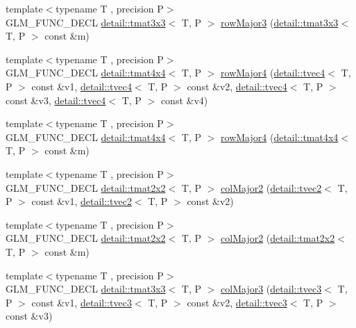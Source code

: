 \begin{DoxyCompactItemize}
{\footnotesize template$<$typename T , precision P$>$ }\\G\+L\+M\+\_\+\+F\+U\+N\+C\+\_\+\+D\+E\+CL \hyperlink{structglm_1_1detail_1_1tmat3x3}{detail\+::tmat3x3}$<$ T, P $>$ \hyperlink{group__gtx__matrix__major__storage_gafb5e7381b2451a85db394c457c284fb7}{row\+Major3} (\hyperlink{structglm_1_1detail_1_1tmat3x3}{detail\+::tmat3x3}$<$ T, P $>$ const \&m)
\item 
{\footnotesize template$<$typename T , precision P$>$ }\\G\+L\+M\+\_\+\+F\+U\+N\+C\+\_\+\+D\+E\+CL \hyperlink{structglm_1_1detail_1_1tmat4x4}{detail\+::tmat4x4}$<$ T, P $>$ \hyperlink{group__gtx__matrix__major__storage_gaba5dbb8fa29fcf57c80daf43ca7cf9db}{row\+Major4} (\hyperlink{structglm_1_1detail_1_1tvec4}{detail\+::tvec4}$<$ T, P $>$ const \&v1, \hyperlink{structglm_1_1detail_1_1tvec4}{detail\+::tvec4}$<$ T, P $>$ const \&v2, \hyperlink{structglm_1_1detail_1_1tvec4}{detail\+::tvec4}$<$ T, P $>$ const \&v3, \hyperlink{structglm_1_1detail_1_1tvec4}{detail\+::tvec4}$<$ T, P $>$ const \&v4)
\item 
{\footnotesize template$<$typename T , precision P$>$ }\\G\+L\+M\+\_\+\+F\+U\+N\+C\+\_\+\+D\+E\+CL \hyperlink{structglm_1_1detail_1_1tmat4x4}{detail\+::tmat4x4}$<$ T, P $>$ \hyperlink{group__gtx__matrix__major__storage_ga1a797d9a3f0d6b81e50b4f1bef2ed281}{row\+Major4} (\hyperlink{structglm_1_1detail_1_1tmat4x4}{detail\+::tmat4x4}$<$ T, P $>$ const \&m)
\item 
{\footnotesize template$<$typename T , precision P$>$ }\\G\+L\+M\+\_\+\+F\+U\+N\+C\+\_\+\+D\+E\+CL \hyperlink{structglm_1_1detail_1_1tmat2x2}{detail\+::tmat2x2}$<$ T, P $>$ \hyperlink{group__gtx__matrix__major__storage_gae53863d1ced5629d5aa3ce04abf14ab1}{col\+Major2} (\hyperlink{structglm_1_1detail_1_1tvec2}{detail\+::tvec2}$<$ T, P $>$ const \&v1, \hyperlink{structglm_1_1detail_1_1tvec2}{detail\+::tvec2}$<$ T, P $>$ const \&v2)
\item 
{\footnotesize template$<$typename T , precision P$>$ }\\G\+L\+M\+\_\+\+F\+U\+N\+C\+\_\+\+D\+E\+CL \hyperlink{structglm_1_1detail_1_1tmat2x2}{detail\+::tmat2x2}$<$ T, P $>$ \hyperlink{group__gtx__matrix__major__storage_ga84d93f2dea8fd341232f0505038d50f6}{col\+Major2} (\hyperlink{structglm_1_1detail_1_1tmat2x2}{detail\+::tmat2x2}$<$ T, P $>$ const \&m)
\item 
{\footnotesize template$<$typename T , precision P$>$ }\\G\+L\+M\+\_\+\+F\+U\+N\+C\+\_\+\+D\+E\+CL \hyperlink{structglm_1_1detail_1_1tmat3x3}{detail\+::tmat3x3}$<$ T, P $>$ \hyperlink{group__gtx__matrix__major__storage_ga8bc9dc6fcd7017b7123a151d9f251013}{col\+Major3} (\hyperlink{structglm_1_1detail_1_1tvec3}{detail\+::tvec3}$<$ T, P $>$ const \&v1, \hyperlink{structglm_1_1detail_1_1tvec3}{detail\+::tvec3}$<$ T, P $>$ const \&v2, \hyperlink{structglm_1_1detail_1_1tvec3}{detail\+::tvec3}$<$ T, P $>$ const \&v3)

\end{DoxyCompactItemize}
